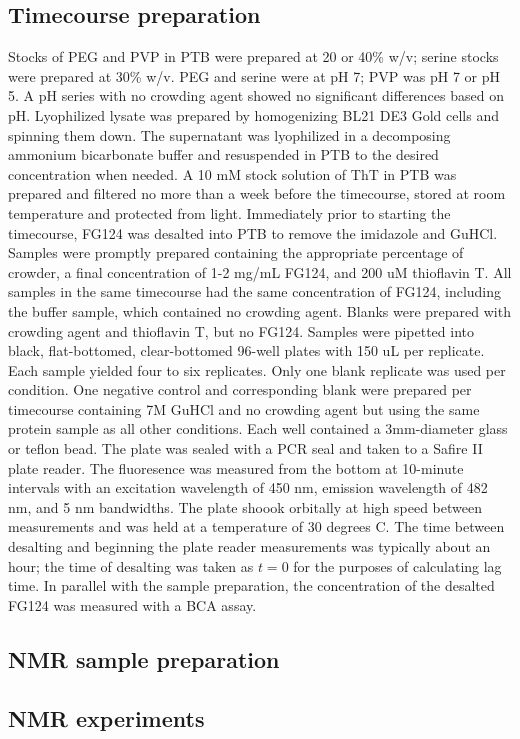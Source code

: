 \subsection{Timecourse preparation} Stocks of PEG and PVP in PTB were prepared at 20 or 40\% w/v; serine stocks were prepared at 30\% w/v.  PEG and serine were at pH 7; PVP was pH 7 or pH 5.  A pH series with no crowding agent showed no significant differences based on pH.  Lyophilized lysate was prepared by homogenizing BL21 DE3 Gold cells and spinning them down.  The supernatant was lyophilized in a decomposing ammonium bicarbonate buffer and resuspended in PTB to the desired concentration when needed.  A 10 mM stock solution of ThT in PTB was prepared and filtered no more than a week before the timecourse, stored at room temperature and protected from light.  Immediately prior to starting the timecourse, FG124 was desalted into PTB to remove the imidazole and GuHCl.  Samples were promptly prepared containing the appropriate percentage of crowder, a final concentration of 1-2 mg/mL FG124, and 200 uM thioflavin T.  All samples in the same timecourse had the same concentration of FG124, including the buffer sample, which contained no crowding agent.  Blanks were prepared with crowding agent and thioflavin T, but no FG124.  Samples were pipetted into black, flat-bottomed, clear-bottomed 96-well plates with 150 uL per replicate.  Each sample yielded four to six replicates.  Only one blank replicate was used per condition.  One negative control and corresponding blank were prepared per timecourse containing 7M GuHCl and no crowding agent but using the same protein sample as all other conditions.  Each well contained a 3mm-diameter glass or teflon bead.  The plate was sealed with a PCR seal and taken to a Safire II plate reader.  The fluoresence was measured from the bottom at 10-minute intervals with an excitation wavelength of 450 nm, emission wavelength of 482 nm, and 5 nm bandwidths.  The plate shoook orbitally at high speed between measurements and was held at a temperature of 30 degrees C.  The time between desalting and beginning the plate reader measurements was typically about an hour; the time of desalting was taken as $t=0$ for the purposes of calculating lag time. In parallel with the sample preparation, the concentration of the desalted FG124 was measured with a BCA assay.
\subsection{NMR sample preparation}
\subsection{NMR experiments}
